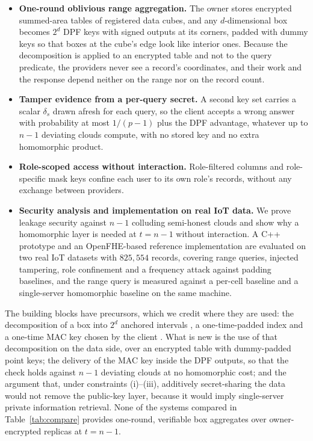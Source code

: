 \begin{itemize}
\item \textbf{One-round oblivious range aggregation.} The owner stores
encrypted summed-area tables of registered data cubes, and any
$d$-dimensional box becomes $2^d$ DPF keys with signed outputs at its corners,
padded with dummy keys so that boxes at the cube's edge look like interior
ones. Because the decomposition is applied to an encrypted table and not to the
query predicate, the providers never see a record's coordinates, and their work
and the response depend neither on the range nor on the record count.
\item \textbf{Tamper evidence from a per-query secret.} A second key set
carries a scalar $\delta_s$ drawn afresh for each query, so the client accepts
a wrong answer with probability at most $1/(p-1)$ plus the DPF advantage,
whatever up to $n-1$ deviating clouds compute, with no stored key and no extra
homomorphic product.
\item \textbf{Role-scoped access without interaction.} Role-filtered columns
and role-specific mask keys confine each user to its own role's records,
without any exchange between providers.
\item \textbf{Security analysis and implementation on real IoT data.} We prove
leakage security against $n-1$ colluding semi-honest clouds and show why a
homomorphic layer is needed at $t=n-1$ without interaction. A C++ prototype and
an OpenFHE-based reference implementation are evaluated on two real IoT
datasets with $825{,}554$ records, covering range queries, injected tampering,
role confinement and a frequency attack against padding baselines, and the
range query is measured against a per-cell baseline and a single-server
homomorphic baseline on the same machine.
\end{itemize}

The building blocks have precursors, which we credit where they are used: the
decomposition of a box into $2^d$ anchored intervals
\citep{boyle2016function}, a one-time-padded index \citep{dory} and a one-time
MAC key chosen by the client \citep{li2026silent}. What is new is the use of
that decomposition on the data side, over an encrypted table with dummy-padded
point keys; the delivery of the MAC key inside the DPF outputs, so that the
check holds against $n-1$ deviating clouds at no homomorphic cost; and the
argument that, under constraints (i)--(iii), additively secret-sharing the data
would not remove the public-key layer, because it would imply single-server private
information retrieval. None of the systems compared in Table~\ref{tab:compare} provides
one-round, verifiable box aggregates over owner-encrypted replicas at $t=n-1$.


